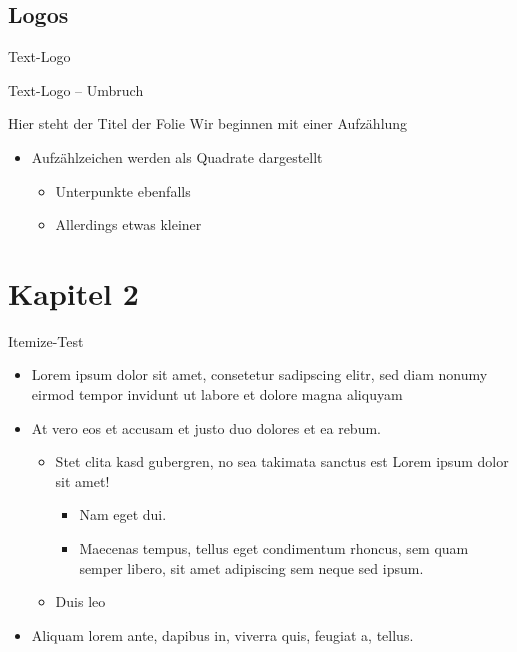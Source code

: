 \documentclass[fleqn,11pt,aspectratio=169]{beamer}
\begin{document}
\subsection{Logos}

{
\begin{frame}{Text-Logo}
\end{frame}}

{
\begin{frame}{Text-Logo -- Umbruch}
\end{frame}}

\begin{frame}{Hier steht der Titel der Folie}
Wir beginnen mit einer Aufzählung
\begin{itemize}
  \item Aufzählzeichen werden als Quadrate dargestellt
  \begin{itemize}
    \item Unterpunkte ebenfalls
    \item Allerdings etwas kleiner
  \end{itemize}
\end{itemize}
\end{frame}


\section{Kapitel 2}

\begin{frame}{Itemize-Test}
  \begin{itemize}
    \item Lorem ipsum dolor sit amet, consetetur sadipscing elitr, sed diam
      nonumy eirmod tempor invidunt ut labore et dolore magna aliquyam
    \item At vero eos et accusam et justo duo dolores et ea rebum.
      \begin{itemize}
        \item Stet clita kasd gubergren, no sea takimata sanctus est Lorem ipsum
          dolor sit amet!
          \begin{itemize}
            \item Nam eget dui.
            \item Maecenas tempus, tellus eget condimentum rhoncus, sem quam
              semper libero, sit amet adipiscing sem neque sed ipsum.
          \end{itemize}
        \item Duis leo
      \end{itemize}
    \item Aliquam lorem ante, dapibus in, viverra quis, feugiat a, tellus. 
  \end{itemize}
\end{frame}
\end{document}
